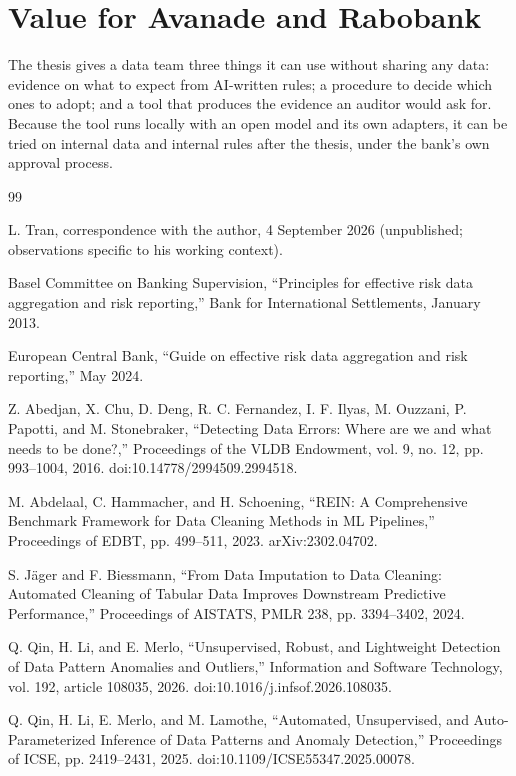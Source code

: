 \documentclass[11pt,a4paper]{article}
\begin{document}
\section{Value for Avanade and Rabobank}

The thesis gives a data team three things it can use without sharing any data: evidence on what to expect from AI-written rules; a procedure to decide which ones to adopt; and a tool that produces the evidence an auditor would ask for. Because the tool runs locally with an open model and its own adapters, it can be tried on internal data and internal rules after the thesis, under the bank's own approval process.

\begin{thebibliography}{99}
\footnotesize
\setlength{\itemsep}{0pt}
\setlength{\parskip}{0pt}

 L. Tran, correspondence with the author, 4 September 2026 (unpublished; observations specific to his working context).

 Basel Committee on Banking Supervision, ``Principles for effective risk data aggregation and risk reporting,'' Bank for International Settlements, January 2013.

 European Central Bank, ``Guide on effective risk data aggregation and risk reporting,'' May 2024.

 Z. Abedjan, X. Chu, D. Deng, R. C. Fernandez, I. F. Ilyas, M. Ouzzani, P. Papotti, and M. Stonebraker, ``Detecting Data Errors: Where are we and what needs to be done?,'' Proceedings of the VLDB Endowment, vol. 9, no. 12, pp. 993--1004, 2016. doi:10.14778/2994509.2994518.

 M. Abdelaal, C. Hammacher, and H. Schoening, ``REIN: A Comprehensive Benchmark Framework for Data Cleaning Methods in ML Pipelines,'' Proceedings of EDBT, pp. 499--511, 2023. arXiv:2302.04702.

 S. J\"ager and F. Biessmann, ``From Data Imputation to Data Cleaning: Automated Cleaning of Tabular Data Improves Downstream Predictive Performance,'' Proceedings of AISTATS, PMLR 238, pp. 3394--3402, 2024.

 Q. Qin, H. Li, and E. Merlo, ``Unsupervised, Robust, and Lightweight Detection of Data Pattern Anomalies and Outliers,'' Information and Software Technology, vol. 192, article 108035, 2026. doi:10.1016/j.infsof.2026.108035.

 Q. Qin, H. Li, E. Merlo, and M. Lamothe, ``Automated, Unsupervised, and Auto-Parameterized Inference of Data Patterns and Anomaly Detection,'' Proceedings of ICSE, pp. 2419--2431, 2025. doi:10.1109/ICSE55347.2025.00078.


\end{thebibliography}
\end{document}
